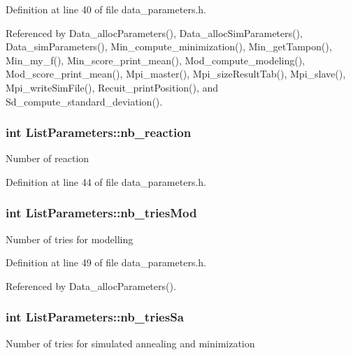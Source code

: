 Definition at line 40 of file data\_\-parameters.h.



Referenced by Data\_\-allocParameters(), Data\_\-allocSimParameters(), Data\_\-simParameters(), Min\_\-compute\_\-minimization(), Min\_\-getTampon(), Min\_\-my\_\-f(), Min\_\-score\_\-print\_\-mean(), Mod\_\-compute\_\-modeling(), Mod\_\-score\_\-print\_\-mean(), Mpi\_\-master(), Mpi\_\-sizeResultTab(), Mpi\_\-slave(), Mpi\_\-writeSimFile(), Recuit\_\-printPosition(), and Sd\_\-compute\_\-standard\_\-deviation().

\hypertarget{structListParameters_a1bd4ac749f2642216552aa20a2305727}{
\subsubsection[{nb\_\-reaction}]{\setlength{\rightskip}{0pt plus 5cm}int {\bf ListParameters::nb\_\-reaction}}}
\label{structListParameters_a1bd4ac749f2642216552aa20a2305727}
Number of reaction 

Definition at line 44 of file data\_\-parameters.h.

\hypertarget{structListParameters_a43227ba7fdca24b48e08a561d2c417b3}{
\subsubsection[{nb\_\-triesMod}]{\setlength{\rightskip}{0pt plus 5cm}int {\bf ListParameters::nb\_\-triesMod}}}
\label{structListParameters_a43227ba7fdca24b48e08a561d2c417b3}
Number of tries for modelling 

Definition at line 49 of file data\_\-parameters.h.



Referenced by Data\_\-allocParameters().

\hypertarget{structListParameters_afb96e3b0b020bfb8d52448fac7447d3a}{
\subsubsection[{nb\_\-triesSa}]{\setlength{\rightskip}{0pt plus 5cm}int {\bf ListParameters::nb\_\-triesSa}}}
\label{structListParameters_afb96e3b0b020bfb8d52448fac7447d3a}
Number of tries for simulated annealing and minimization 

